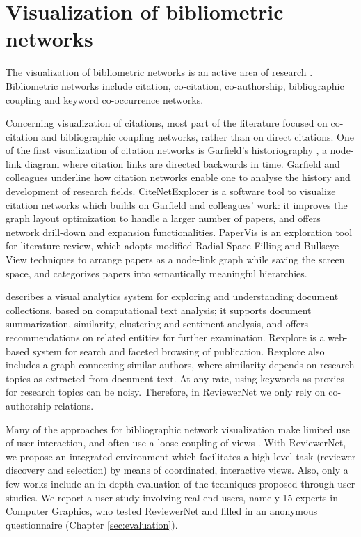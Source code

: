 \section{Visualization of bibliometric networks}
\label{sec:bibvis}
The visualization of bibliometric networks is an active area of research \cite{Ch13,FeHe17}. Bibliometric networks include citation, co-citation, co-authorship, bibliographic coupling and keyword co-occurrence networks. 

Concerning visualization of citations, most part of the literature focused on co-citation and bibliographic coupling networks, rather than on direct citations. One of the first visualization of citation networks is Garfield's historiography \cite{GaPu03}, a node-link diagram where citation links are directed backwards in time. Garfield and colleagues underline how citation networks enable one to analyse the history and development of research fields. CiteNetExplorer \cite{vEWa14} is a software tool to visualize citation networks which builds on Garfield and colleagues' work: it improves the graph layout optimization to handle a larger number of papers, and offers network drill-down and expansion functionalities. PaperVis \cite{ChYa11} is an exploration tool for literature review, which adopts modified Radial Space Filling and Bullseye View techniques to arrange papers as a node-link graph while saving the screen space, and categorizes papers into semantically meaningful hierarchies. 

\cite{GoLi13} describes a visual analytics system for exploring and understanding document collections, based on computational text analysis; it supports document summarization, similarity, clustering and sentiment analysis, and offers recommendations on related entities for further examination. Rexplore \cite{OsMo13} is a web-based system for search and faceted browsing of publication. Rexplore also includes a graph connecting similar authors, where similarity depends on research topics as extracted from document text. At any rate, using keywords as proxies for research topics can be noisy. Therefore, in ReviewerNet we only rely on co-authorship relations.    

Many of the approaches for bibliographic network visualization make limited use of user interaction, and often use a loose coupling of views \cite{FeHe17}. With ReviewerNet, we propose an integrated environment which facilitates a high-level task (reviewer discovery and selection) by means of coordinated, interactive views. Also, only a few works include an in-depth evaluation of the techniques proposed through user studies. We report a user study involving real end-users, namely 15 experts in Computer Graphics, who tested ReviewerNet and filled in an anonymous questionnaire (Chapter \ref{sec:evaluation}).  



